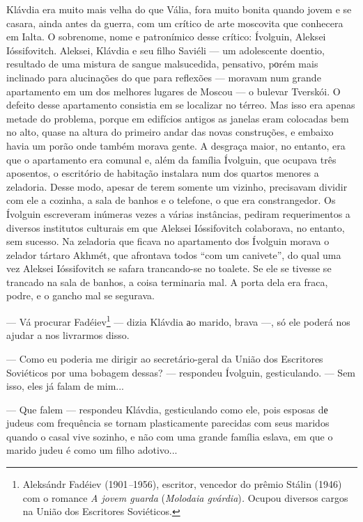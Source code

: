 Klávdia era muito mais velha do que Vália, fora muito bonita quando
jovem e se casara, ainda antes da guerra, com um crítico de arte
moscovita que conhecera em Ialta. O sobrenome, nome e patronímico desse
crítico: Ívolguin, Aleksei Ióssifovitch. Aleksei, Klávdia e seu filho
Saviéli --- um adolescente doentio, resultado de uma mistura de sangue
malsucedida, pensativo, pоrém mais inclinado para alucinações do que
para reflexões --- moravam num grande apartamento em um dos melhores
lugares de Moscou --- o bulevar Tverskói. O defeito desse apartamento
consistia em se localizar no térreo. Mas isso era apenas metade do
problema, porque em edifícios antigos as janelas eram colocadas bem no
alto, quase na altura do primeiro andar das novas construções, e embaixo
havia um porão onde também morava gente. A desgraça maior, no entanto,
era que o apartamento era comunal e, além da família Ívolguin, que
ocupava três aposentos, o escritório de habitação instalara num dos
quartos menores a zeladoria. Desse modo, apesar de terem somente um
vizinho, precisavam dividir com ele a cozinha, a sala de banhos e o
telefone, o que era constrangedor. Os Ívolguin escreveram inúmeras vezes
a várias instâncias, pediram requerimentos a diversos institutos
culturais em que Aleksei Ióssifovitch colaborava, no entanto, sem
sucesso. Na zeladoria que ficava no apartamento dos Ívolguin morava o
zelador tártaro Akhmét, que afrontava todos ``com um canivete'', do qual
uma vez Aleksei Ióssifovitch se safara trancando-se no toalete. Se ele
se tivesse se trancado na sala de banhos, a coisa terminaria mal. A
porta dela era fraca, podre, e o gancho mal se segurava.

--- Vá procurar Fadéiev\footnote{Aleksándr Fadéiev (1901\emph{--}1956),
  escritor, vencedor do prêmio Stálin (1946) com o romance \emph{A jovem
  guarda} (\emph{Molodaia gvárdia})\emph{.} Ocupou diversos cargos na
  União dos Escritores Soviéticos.} --- dizia Klávdia аo marido, brava
---, só ele poderá nos ajudar a nos livrarmos disso.

--- Como eu poderia me dirigir ao secretário-geral da União dos
Escritores Soviéticos por uma bobagem dessas? --- respondeu Ívolguin,
gesticulando. --- Sem isso, eles já falam de mim...

--- Que falem --- respondeu Klávdia, gesticulando como ele, pois esposas
dе judeus com frequência se tornam plasticamente parecidas com seus
maridos quando o casal vive sozinho, e não com uma grande família
eslava, em que o marido judeu é como um filho adotivo...

